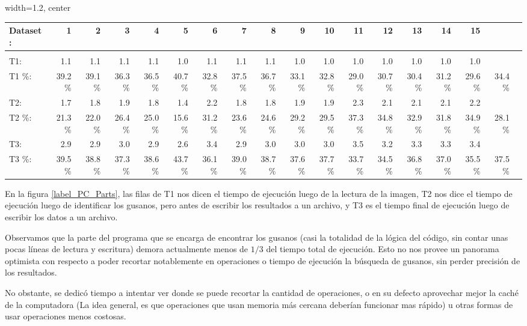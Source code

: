 \documentclass{article}
\begin{document}
\begin{figure*}[h]\centering
\scriptsize
\begin{adjustbox}{width=1.2\textwidth, center}
\begin{tabular}{|l|rrrrrrrrrrrrrrr|r|r|}\toprule
Dataset: &1 &2 &3 &4 &5 &6 &7 &8 &9 &10 &11 &12 &13 &14 &15 & \\
\hline \\
T1: &1.1 &1.1 &1.1 &1.1 &1.0 &1.1 &1.1 &1.1 &1.0 &1.0 &1.0 &1.0 &1.0 &1.0 &1.0 & \\
T1 \%: &39.2\% &39.1\% &36.3\% &36.5\% &40.7\% &32.8\% &37.5\% &36.7\% &33.1\% &32.8\% &29.0\% &30.7\% &30.4\% &31.2\% &29.6\% &34.4\% \\
T2: &1.7 &1.8 &1.9 &1.8 &1.4 &2.2 &1.8 &1.8 &1.9 &1.9 &2.3 &2.1 &2.1 &2.1 &2.2 & \\
T2 \%: &21.3\% &22.0\% &26.4\% &25.0\% &15.6\% &31.2\% &23.6\% &24.6\% &29.2\% &29.5\% &37.3\% &34.8\% &32.9\% &31.8\% &34.9\% &28.1\% \\
T3: &2.9 &2.9 &3.0 &2.9 &2.6 &3.4 &2.9 &3.0 &3.0 &3.0 &3.5 &3.2 &3.3 &3.3 &3.4 & \\
T3 \%: &39.5\% &38.8\% &37.3\% &38.6\% &43.7\% &36.1\% &39.0\% &38.7\% &37.6\% &37.7\% &33.7\% &34.5\% &36.8\% &37.0\% &35.5\% &37.5\% \\
\bottomrule
\end{tabular}
\end{adjustbox}
\caption{Distribución del tiempo de ejecución}
\label{label_PC_Parts}
\end{figure*}

En la figura \ref{label_PC_Parts}, las filas de T1 nos dicen el tiempo de ejecución luego de la lectura de la imagen, T2 nos dice el tiempo de ejecución luego de identificar los gusanos, pero antes de escribir los resultados a un archivo, y T3 es el tiempo final de ejecución luego de escribir los datos a un archivo.

Observamos que la parte del programa que se encarga de encontrar los gusanos (casi la totalidad de la lógica del código, sin contar unas pocas líneas de lectura y escritura) demora actualmente menos de $1/3$ del tiempo total de ejecución. Esto no nos provee un panorama optimista con respecto a poder recortar notablemente en operaciones o tiempo de ejecución la búsqueda de gusanos, sin perder precisión de los resultados.

No obstante, se dedicó tiempo a intentar ver donde se puede recortar la cantidad de operaciones, o en su defecto aprovechar mejor la caché de la computadora\cite{cache} (La idea general, es que operaciones que usan memoria más cercana deberían funcionar mas rápido) u otras formas de usar operaciones menos costosas.
\end{document}

